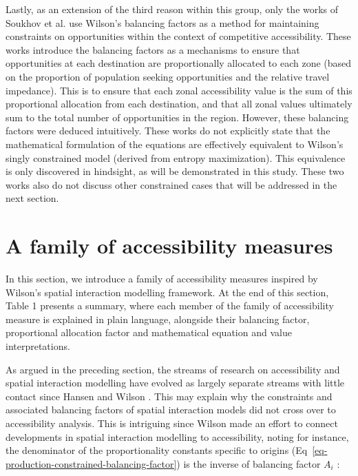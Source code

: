 \documentclass[
  10pt,
  letterpaper,
]{article}
\begin{document}
Lastly, as an extension of the third reason within this group, only the
works of Soukhov et al.
\citep{soukhovIntroducingSpatialAvailability2023, soukhovMultimodalSpatialAvailability2024}
use Wilson's \citep{wilson1971} balancing factors as a method for
maintaining constraints on opportunities within the context of
competitive accessibility. These works introduce the balancing factors
as a mechanisms to ensure that opportunities at each destination are
proportionally allocated to each zone (based on the proportion of
population seeking opportunities and the relative travel impedance).
This is to ensure that each zonal accessibility value is the sum of this
proportional allocation from each destination, and that all zonal values
ultimately sum to the total number of opportunities in the region.
However, these balancing factors were deduced intuitively. These works
do not explicitly state that the mathematical formulation of the
equations are effectively equivalent to Wilson's singly constrained
model (derived from entropy maximization). This equivalence is only
discovered in hindsight, as will be demonstrated in this study. These
two works also do not discuss other constrained cases that will be
addressed in the next section.

\section{A family of accessibility
measures}\label{a-family-of-accessibility-measures}

In this section, we introduce a family of accessibility measures
inspired by Wilson's spatial interaction modelling framework. At the end
of this section, Table 1 presents a summary, where each member of the
family of accessibility measure is explained in plain language,
alongside their balancing factor, proportional allocation factor and
mathematical equation and value interpretations.

As argued in the preceding section, the streams of research on
accessibility and spatial interaction modelling have evolved as largely
separate streams with little contact since Hansen \citep{hansen1959} and
Wilson \citep{wilson1971}. This may explain why the constraints and
associated balancing factors of spatial interaction models did not cross
over to accessibility analysis. This is intriguing since Wilson made an
effort to connect developments in spatial interaction modelling to
accessibility, noting for instance, the denominator of the
proportionality constants specific to origins
(Eq~\ref{eq-production-constrained-balancing-factor}) is the inverse of
balancing factor \(A_i\) \citep[ p.~10]{wilson1971}:
\end{document}
